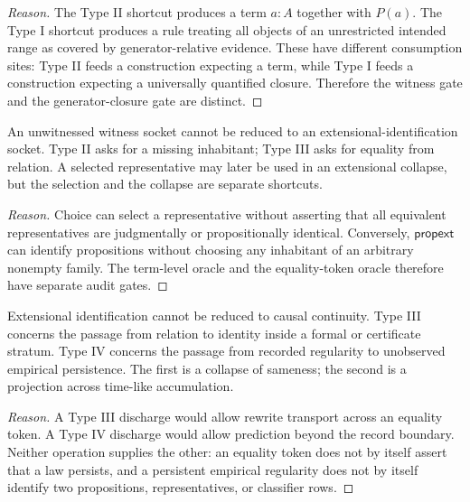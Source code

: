 \begin{proof}[Reason]
The Type II shortcut produces a term $a:A$ together with $P(a)$. The Type I shortcut produces a rule treating all objects of an unrestricted intended range as covered by generator-relative evidence. These have different consumption sites: Type II feeds a construction expecting a term, while Type I feeds a construction expecting a universally quantified closure. Therefore the witness gate and the generator-closure gate are distinct.
\end{proof}

\begin{lemma}
\label{lem:transcendental-supply-II-not-III}
An unwitnessed witness socket cannot be reduced to an extensional-identification socket. Type II asks for a missing inhabitant; Type III asks for equality from relation. A selected representative may later be used in an extensional collapse, but the selection and the collapse are separate shortcuts.
\end{lemma}

\begin{proof}[Reason]
Choice can select a representative without asserting that all equivalent representatives are judgmentally or propositionally identical. Conversely, $\mathsf{propext}$ can identify propositions without choosing any inhabitant of an arbitrary nonempty family. The term-level oracle and the equality-token oracle therefore have separate audit gates.
\end{proof}

\begin{lemma}
\label{lem:transcendental-supply-III-not-IV}
Extensional identification cannot be reduced to causal continuity. Type III concerns the passage from relation to identity inside a formal or certificate stratum. Type IV concerns the passage from recorded regularity to unobserved empirical persistence. The first is a collapse of sameness; the second is a projection across time-like accumulation.
\end{lemma}

\begin{proof}[Reason]
A Type III discharge would allow rewrite transport across an equality token. A Type IV discharge would allow prediction beyond the record boundary. Neither operation supplies the other: an equality token does not by itself assert that a law persists, and a persistent empirical regularity does not by itself identify two propositions, representatives, or classifier rows.
\end{proof}

